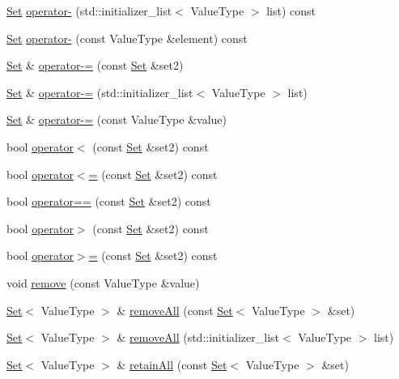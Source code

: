 \begin{DoxyCompactItemize}
\item 
\mbox{\hyperlink{classSet}{Set}} \mbox{\hyperlink{classSet_a49469b442bd79d701ec74be9cd886db8}{operator-\/}} (std\+::initializer\+\_\+list$<$ Value\+Type $>$ list) const
\item 
\mbox{\hyperlink{classSet}{Set}} \mbox{\hyperlink{classSet_a7a14be608a97119c6e22bf317f442d8a}{operator-\/}} (const Value\+Type \&element) const
\item 
\mbox{\hyperlink{classSet}{Set}} \& \mbox{\hyperlink{classSet_a23e65f7b00322e3a8ae4d4b5c798d3fd}{operator-\/=}} (const \mbox{\hyperlink{classSet}{Set}} \&set2)
\item 
\mbox{\hyperlink{classSet}{Set}} \& \mbox{\hyperlink{classSet_ad727c12a9c6fe85b3435b4520d4565c9}{operator-\/=}} (std\+::initializer\+\_\+list$<$ Value\+Type $>$ list)
\item 
\mbox{\hyperlink{classSet}{Set}} \& \mbox{\hyperlink{classSet_a01918f11b3fb654a37f423af8c2574cc}{operator-\/=}} (const Value\+Type \&value)
\item 
bool \mbox{\hyperlink{classSet_a0dc952ee4c46dc337141d6bc7749ae09}{operator$<$}} (const \mbox{\hyperlink{classSet}{Set}} \&set2) const
\item 
bool \mbox{\hyperlink{classSet_a5fa22b91eacd2a4991642e4d92ab5024}{operator$<$=}} (const \mbox{\hyperlink{classSet}{Set}} \&set2) const
\item 
bool \mbox{\hyperlink{classSet_a5cb3d35ea437e5d1a2e7b9c2542756ad}{operator==}} (const \mbox{\hyperlink{classSet}{Set}} \&set2) const
\item 
bool \mbox{\hyperlink{classSet_a03e2d0f31abc1d4fb14085cc3be47f4d}{operator$>$}} (const \mbox{\hyperlink{classSet}{Set}} \&set2) const
\item 
bool \mbox{\hyperlink{classSet_a57ba3133542a03f89b25503a5486cb77}{operator$>$=}} (const \mbox{\hyperlink{classSet}{Set}} \&set2) const
\item 
void \mbox{\hyperlink{classSet_ab8213d15b557acafdd461c231e9ade3b}{remove}} (const Value\+Type \&value)
\item 
\mbox{\hyperlink{classSet}{Set}}$<$ Value\+Type $>$ \& \mbox{\hyperlink{classSet_a166c0388f87629ba27b00852f4a9a9f2}{remove\+All}} (const \mbox{\hyperlink{classSet}{Set}}$<$ Value\+Type $>$ \&set)
\item 
\mbox{\hyperlink{classSet}{Set}}$<$ Value\+Type $>$ \& \mbox{\hyperlink{classSet_a803c5b6d1e6b33cc7359ff2018d8822a}{remove\+All}} (std\+::initializer\+\_\+list$<$ Value\+Type $>$ list)
\item 
\mbox{\hyperlink{classSet}{Set}}$<$ Value\+Type $>$ \& \mbox{\hyperlink{classSet_a957880d54b01f32c9419cf02fdb5bf1e}{retain\+All}} (const \mbox{\hyperlink{classSet}{Set}}$<$ Value\+Type $>$ \&set)

\end{DoxyCompactItemize}
